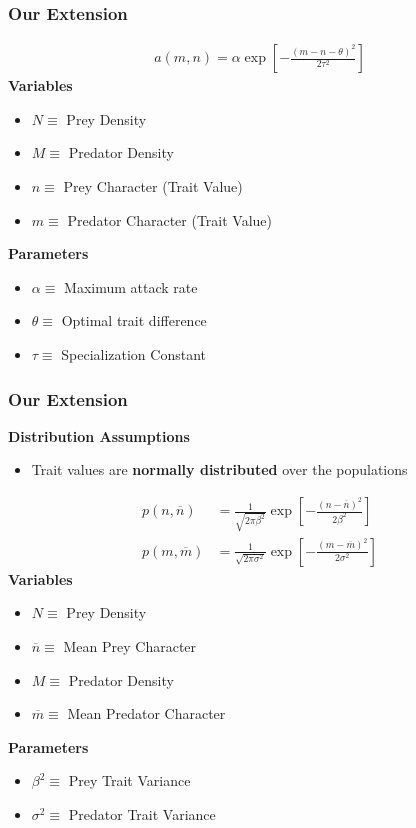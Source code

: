 \documentclass[10pt]{beamer}
\begin{document}
\begin{frame}
	\frametitle{Our Extension}
	\begin{align*}
		a(m, n) = \alpha \exp\left[-\frac{(m - n - \theta)^2}{2\tau^2}\right]
	\end{align*}
	{\bf Variables}
	\begin{itemize}
		\item $N \equiv $ Prey Density
		\item $M \equiv $ Predator Density
		\item $n \equiv $ Prey Character (Trait Value)
		\item $m \equiv $ Predator Character (Trait Value)
	\end{itemize}
	{\bf Parameters}
	\begin{itemize}
		\item $\alpha \equiv $ Maximum attack rate
		\item $\theta \equiv $ Optimal trait difference
		\item $\tau \equiv $ Specialization Constant
	\end{itemize}
\end{frame}
\begin{frame}
	\frametitle{Our Extension}
	{\bf Distribution Assumptions}
	\begin{itemize}
		\item Trait values are {\bf normally distributed} over the populations
	\end{itemize}
	\begin{align*}
		p(n, \overline{n}) &= \frac{1}{\sqrt{2\pi\beta^2}}\exp\left[{-\frac{(n - \overline{n})^2}{2\beta^2}}\right] \\
		p(m, \overline{m}) &= \frac{1}{\sqrt{2\pi\sigma^2}}\exp\left[{-\frac{(m - \overline{m})^2}{2\sigma^2}}\right]
	\end{align*}
	{\bf Variables}
	\begin{itemize}
		\item $N \equiv $ Prey Density
		\item $\overline{n} \equiv $ Mean Prey Character
		\item $M \equiv $ Predator Density
		\item $\overline{m} \equiv $ Mean Predator Character
	\end{itemize}
	{\bf Parameters}
	\begin{itemize}
		\item $\beta^2 \equiv $ Prey Trait Variance
		\item $\sigma^2 \equiv $ Predator Trait Variance
	\end{itemize}
\end{frame}
\end{document}
